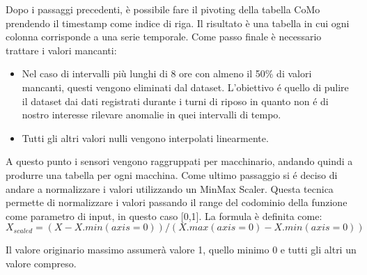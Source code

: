 Dopo i passaggi precedenti, è possibile fare il pivoting della tabella CoMo  prendendo il timestamp come indice di riga. Il risultato è una tabella in cui ogni colonna corrisponde a una serie temporale. 
Come passo finale è necessario trattare i valori mancanti:
\begin{itemize}
	\item Nel caso di intervalli più lunghi di 8 ore con almeno il 50\% di valori mancanti, questi vengono eliminati dal dataset. L'obiettivo é quello di pulire il dataset dai dati registrati durante i turni di riposo in quanto non é di nostro interesse rilevare anomalie in quei intervalli di tempo.
	\item Tutti gli altri valori nulli vengono interpolati linearmente.
\end{itemize}
A questo punto i sensori vengono raggruppati per macchinario, andando quindi a produrre una tabella per ogni macchina.
Come ultimo passaggio si é deciso di andare a normalizzare i valori utilizzando un MinMax Scaler. Questa tecnica permette di normalizzare i valori passando il range del codominio della funzione come parametro di input, in questo caso [0,1]. La formula è definita come:
\[X_{scaled} = (X - X.min(axis=0)) / (X.max(axis=0) - X.min(axis=0))\]

Il valore originario massimo assumerà valore 1, quello minimo 0 e tutti gli altri un valore compreso.